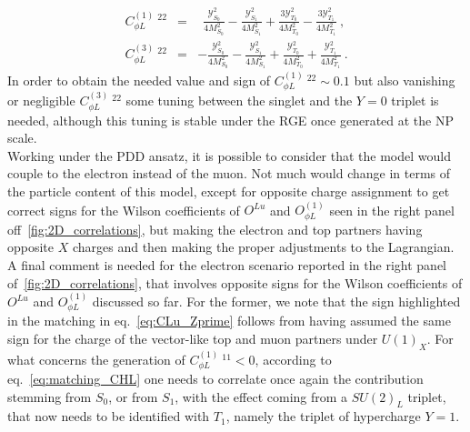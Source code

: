 \begin{eqnarray} 
	\label{eq:matching_CHL}
	C_{\phi L}^{(1)}\ ^{22 } & = &
	\ \ \frac{ \mathcal{Y}^{2}_{S_{0}}}{4 M_{S_{0}}^2} 
	- \frac{ \mathcal{Y}^{2}_{S_{1}}}{4 M_{S_{1}}^2}
	+ \frac{ 3 \mathcal{Y}^{2}_{T_{0}}}{4 M_{T_{0}}^2}
	- \frac{ 3 \mathcal{Y}^{2}_{T_{1}}}{4 M_{T_{1}}^2} \ , \\
	C_{\phi L}^{(3)} \ ^ {22} & = & 
	- \frac{ \mathcal{Y}^{2}_{S_{0}}}{4 M_{S_{0}}^2}
	- \frac{ \mathcal{Y}^{2}_{S_{1}}}{4 M_{S_{1}}^2}
	+ \frac{ \mathcal{Y}^{2}_{T_{0}}}{4 M_{T_{0}}^2}
	+ \frac{ \mathcal{Y}^{2}_{T_{1}}}{4 M_{T_{1}}^2} \ . \nonumber
\end{eqnarray}
In order to obtain the needed value and sign of  $C_{\phi L}^{(1)}\ ^{22} \sim 0.1$ but also vanishing or negligible  $C_{\phi L}^{(3)}\ ^{22}$ some tuning between the singlet and the $Y=0$ triplet is needed, although this tuning is stable under the RGE once generated at the NP scale. \\
Working under the PDD ansatz, it is possible to consider that the model would couple to the electron instead of the muon. Not much would change in terms of the particle content of this model, except for opposite charge assignment to get correct signs for the Wilson coefficients of $O^{Lu}$ and $O_{\phi L}^{(1)}$ seen in the right panel off~\autoref{fig:2D_correlations}, but making the electron and top partners having opposite $X$ charges and then making the proper adjustments to the Lagrangian. 
A final comment is needed for the electron scenario reported in the right panel of~\autoref{fig:2D_correlations}, that involves opposite signs for the Wilson coefficients of $O^{Lu}$ and $O_{\phi L}^{(1)}$ discussed so far. For the former, we note that the sign highlighted in the matching in eq.~\eqref{eq:CLu_Zprime} follows from having assumed the same sign for the charge of the vector-like top and muon partners under $U(1)_{X}$. For what concerns the generation of $C_{\phi L}^{(1)} \ ^{11} < 0 $, according to eq.~\eqref{eq:matching_CHL} one needs to correlate once again the contribution stemming from $S_{0}$, or from $S_{1}$, with the effect coming from a $SU(2)_{L}$ triplet, that now needs to be identified with $T_{1}$, namely the triplet of hypercharge $Y=1$.


